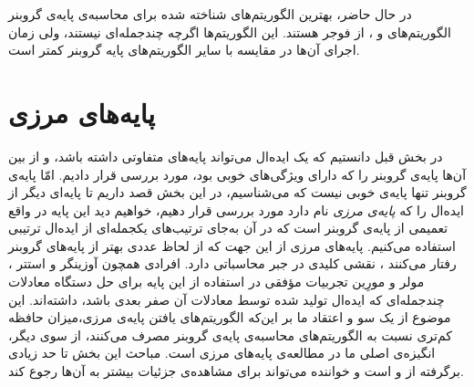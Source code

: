  در حال حاضر، بهترین الگوریتم‌های شناخته شده برای محاسبه‌ی پایه‌ی گروبنر الگوریتم‌های 
\cite{faugere1999new}
و 
\cite{Faugere2002}، 
از فوجر
هستند. این الگوریتم‌ها اگرچه  چندجمله‌ای نیستند، ولی زمان اجرای آن‌ها در مقایسه با سایر الگوریتم‌های پایه گروبنر کمتر است. 



\newpage

\section{پایه‌های مرزی}

در بخش قبل دانستیم که یک ایده‌ال می‌تواند پایه‌های متفاوتی داشته باشد، و از بین آن‌ها پایه‌ی گروبنر را که دارای ویژگی‌های خوبی بود، مورد بررسی قرار دادیم. امّا پایه‌ی گروبنر تنها پایه‌ی خوبی نیست که می‌شناسیم، در این بخش قصد داریم تا پایه‌ای دیگر از ایده‌ال را که 
\textit{پایه‌ی مرزی}
نام دارد مورد بررسی قرار دهیم، خواهیم دید این پایه در واقع تعمیمی از پایه‌ی گروبنر است که در آن به‌جای ترتیب‌های یکجمله‌ای از ایده‌ال ترتیبی استفاده می‌کنیم. پایه‌های مرزی از این جهت که از لحاظ عددی بهتر از پایه‌های گروبنر رفتار می‌کنند
\cite{stetter2004numerical}،
نقشی کلیدی در جبر محاسباتی دارد. افرادی همچون آوزینگر
و استتر
\cite{auzinger1988elimination}،
مولر 
\cite{moller1993systems}
و مورِین
\cite{mourrain1999new}
تجربیات مؤفقی در استفاده از این پایه برای حل دستگاه معادلات چندجمله‌ای  که ایده‌ال تولید شده توسط معادلات آن صفر بعدی باشد، داشته‌اند. این موضوع از یک سو و اعتقاد ما بر این‌که  الگوریتم‌های یافتن پایه‌ی مرزی،میزان حافظه کم‌تری نسبت به الگوریتم‌های محاسبه‌ی پایه‌ی گروبنر مصرف می‌کنند، از سوی دیگر، انگیزه‌ی اصلی ما در مطالعه‌ی پایه‌های مرزی است. مباحث این بخش تا حد زیادی برگرفته از 
\cite{cca2_kreuzer}
و 
\cite{kehrein2006computing}
است و خواننده‌ می‌تواند برای مشاهده‌ی جزئیات بیشتر به آن‌ها رجوع کند.

